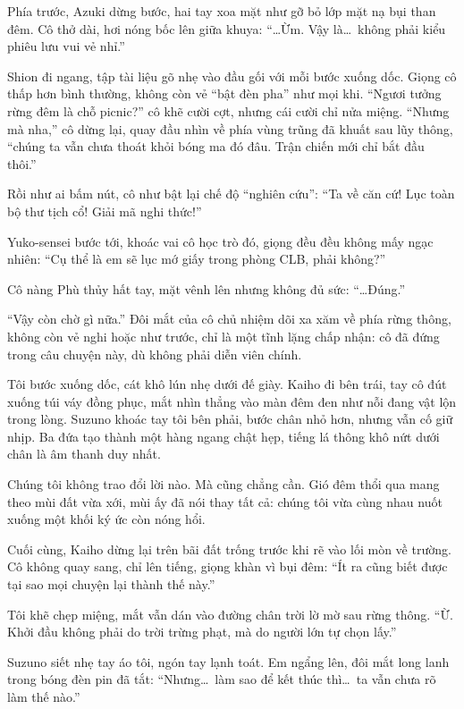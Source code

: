 \documentclass[../main.tex]{subfiles}
\begin{document}
Phía trước, Azuki dừng bước, hai tay xoa mặt như gỡ bỏ lớp mặt nạ bụi than đêm. Cô thở dài, hơi nóng bốc lên giữa khuya: ``\dots Ừm. Vậy là\dots\ không phải kiểu phiêu lưu vui vẻ nhỉ.''

Shion đi ngang, tập tài liệu gõ nhẹ vào đầu gối với mỗi bước xuống dốc. Giọng cô thấp hơn bình thường, không còn vẻ ``bật đèn pha'' như mọi khi. ``Ngươi tưởng rừng đêm là chỗ picnic?'' cô khẽ cười cợt, nhưng cái cười chỉ nửa miệng. ``Nhưng mà nha,'' cô dừng lại, quay đầu nhìn về phía vùng trũng đã khuất sau lũy thông, ``chúng ta vẫn chưa thoát khỏi bóng ma đó đâu. Trận chiến mới chỉ bắt đầu thôi.''

Rồi như ai bấm nút, cô như bật lại chế độ ``nghiên cứu'': ``Ta về căn cứ! Lục toàn bộ thư tịch cổ! Giải mã nghi thức!''

Yuko-sensei bước tới, khoác vai cô học trò đó, giọng đều đều không mấy ngạc nhiên: ``Cụ thể là em sẽ lục mớ giấy trong phòng CLB, phải không?''

Cô nàng Phù thủy hất tay, mặt vênh lên nhưng không đủ sức: ``\dots Đúng.''

``Vậy còn chờ gì nữa.'' Đôi mắt của cô chủ nhiệm dõi xa xăm về phía rừng thông, không còn vẻ nghi hoặc như trước, chỉ là một tĩnh lặng chấp nhận: cô đã đứng trong câu chuyện này, dù không phải diễn viên chính.

Tôi bước xuống dốc, cát khô lún nhẹ dưới đế giày. Kaiho đi bên trái, tay cô đút xuống túi váy đồng phục, mắt nhìn thẳng vào màn đêm đen như nỗi đang vật lộn trong lòng. Suzuno khoác tay tôi bên phải, bước chân nhỏ hơn, nhưng vẫn cố giữ nhịp. Ba đứa tạo thành một hàng ngang chật hẹp, tiếng lá thông khô nứt dưới chân là âm thanh duy nhất.

Chúng tôi không trao đổi lời nào. Mà cũng chẳng cần. Gió đêm thổi qua mang theo mùi đất vừa xới, mùi ấy đã nói thay tất cả: chúng tôi vừa cùng nhau nuốt xuống một khối ký ức còn nóng hổi.

Cuối cùng, Kaiho dừng lại trên bãi đất trống trước khi rẽ vào lối mòn về trường. Cô không quay sang, chỉ lên tiếng, giọng khàn vì bụi đêm: ``Ít ra cũng biết được tại sao mọi chuyện lại thành thế này.''

Tôi khẽ chẹp miệng, mắt vẫn dán vào đường chân trời lờ mờ sau rừng thông. ``Ừ. Khởi đầu không phải do trời trừng phạt, mà do người lớn tự chọn lấy.''

Suzuno siết nhẹ tay áo tôi, ngón tay lạnh toát. Em ngẩng lên, đôi mắt long lanh trong bóng đèn pin đã tắt: ``Nhưng\dots\ làm sao để kết thúc thì\dots\ ta vẫn chưa rõ làm thế nào.''
\end{document}

